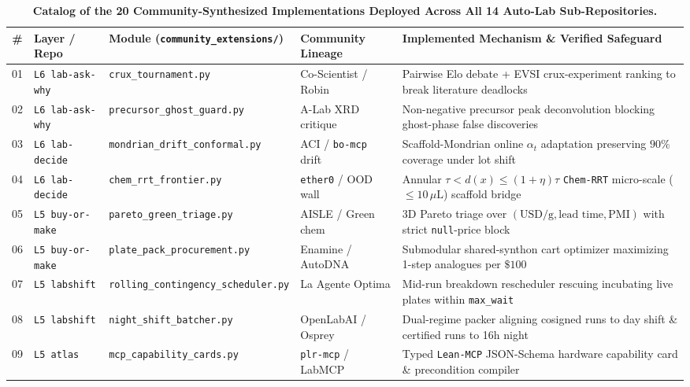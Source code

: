 \documentclass[10pt,letterpaper]{article}
\begin{document}
\begin{table}[t!]
  \centering
  \scriptsize
  \setlength{\tabcolsep}{4.2pt}
  \caption{\textbf{Catalog of the 20 Community-Synthesized Implementations Deployed Across All 14 Auto-Lab Sub-Repositories.}}
  \label{tab:twenty}
  \begin{tabularx}{\textwidth}{@{}clllX@{}}
    \toprule
    \textbf{\#} & \textbf{Layer / Repo} & \textbf{Module (\texttt{community\_extensions/})} & \textbf{Community Lineage} & \textbf{Implemented Mechanism \& Verified Safeguard} \\
    \midrule
    01 & \texttt{L6 lab-ask-why} & \texttt{crux\_tournament.py} & Co-Scientist / Robin & Pairwise Elo debate + EVSI crux-experiment ranking to break literature deadlocks \\
    02 & \texttt{L6 lab-ask-why} & \texttt{precursor\_ghost\_guard.py} & A-Lab XRD critique & Non-negative precursor peak deconvolution blocking ghost-phase false discoveries \\
    03 & \texttt{L6 lab-decide} & \texttt{mondrian\_drift\_conformal.py} & ACI / \texttt{bo-mcp} drift & Scaffold-Mondrian online $\alpha_t$ adaptation preserving $90\%$ coverage under lot shift \\
    04 & \texttt{L6 lab-decide} & \texttt{chem\_rrt\_frontier.py} & \texttt{ether0} / OOD wall & Annular $\tau < d(x) \le (1+\eta)\tau$ \texttt{Chem-RRT} micro-scale ($\le 10\,\mu\text{L}$) scaffold bridge \\
    05 & \texttt{L5 buy-or-make} & \texttt{pareto\_green\_triage.py} & AISLE / Green chem & 3D Pareto triage over $(\text{USD/g}, \text{lead time}, \text{PMI})$ with strict \texttt{null}-price block \\
    06 & \texttt{L5 buy-or-make} & \texttt{plate\_pack\_procurement.py} & Enamine / AutoDNA & Submodular shared-synthon cart optimizer maximizing 1-step analogues per $\$100$ \\
    07 & \texttt{L5 labshift} & \texttt{rolling\_contingency\_scheduler.py} & La Agente Optima & Mid-run breakdown rescheduler rescuing incubating live plates within \texttt{max\_wait} \\
    08 & \texttt{L5 labshift} & \texttt{night\_shift\_batcher.py} & OpenLabAI / Osprey & Dual-regime packer aligning cosigned runs to day shift \& certified runs to 16h night \\
    09 & \texttt{L5 atlas} & \texttt{mcp\_capability\_cards.py} & \texttt{plr-mcp} / LabMCP & Typed \texttt{Lean-MCP} JSON-Schema hardware capability card \& precondition compiler \\

\end{tabularx}
\end{table}
\end{document}
